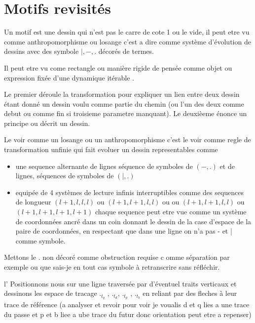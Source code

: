 \documentclass{article}
\begin{document}
\section{Motifs revisités}

Un motif est une dessin qui n'est pas le carre de cote 1 ou le vide, il peut etre vu comme anthropomorphisme ou losange c'est a dire comme système d'évolution de dessins avec des symbole $|,-,.$ décorés de termes.

Il peut etre vu come rectangle ou manière rigide de pensée comme objet ou  expression fixée d'une dynamique itérable .

Le premier déroule  la transformation pour expliquer un lien entre deux dessin étant donné un dessin voulu comme partie du chemin (ou l'un des deux comme debut ou comme fin si troisieme parametre manquant). Le deuxièeme énonce un principe ou décrit un dessin.



Le voir comme un losange ou un anthropomorphisme c'est le voir comme regle de transformation unfinie qui fait evoluer  un dessin 
representables comme 

\begin{itemize}
\item une sequence alternante de lignes séquence de symboles de $(-,.)$ et de lignes, séquences de symboles de   $(|,.)$ 
\item equipée de 4  systèmes de lecture infinis interruptibles comme des sequences de longueur $(l+1,l,l,l)$ ou $(l+1,l+1,l,l)$  ou ou $(l+1,l+1,l,l)$ ou $(l+1,l+1,l+1,l+1)$ chaque sequence peut etre vue comme un système de coordonnées ancré dans un coin donnant le dessin de la case d'espace de la paire de coordonnées, en respectant que dans une ligne on n'a pas - et | comme symbole.
\end{itemize}

Mettons  le . non décoré comme obstruction requise c omme séparation par exemple ou que sais-je en tout cas symbole à retranscrire sans réfléchir.

l'
Positionnons nous sur une ligne traversée par d'éventuel traits verticaux et  dessinons les espace de tracage $._{t_q}$ , $._{t_d}$, $._{t_p}$ , $._{t_b}$ en reliant par des fleches à leur trace de référence  (a analyser et revoir pour voir je voualis d et q lies a une trace du passe et p et b liee a ube trace du futur donc orientation peut etre a repenser)
\end{document}
